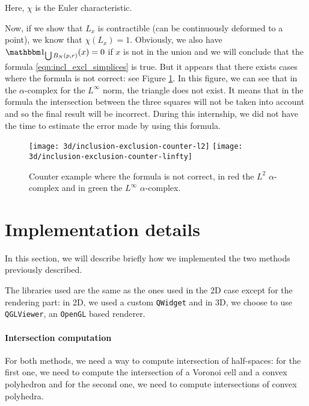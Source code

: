 Here, $ \chi $ is the Euler characteristic.

Now, if we show that $ L_x $ is contractible (can be continuously deformed to a
point), we know that $ \chi(L_x) = 1 $. Obviously, we also have $
\indicator{\bigcup B_N(p, r)}(x) = 0 $ if $ x $ is not in the union and we will
conclude that the formula \ref{eqn:incl_excl_simplices} is true. But it appears
that there exists cases where the formula is not correct: see Figure
\ref{fig:incl_excl-examples}. In this figure, we can see that in the
$\alpha$-complex for the $ L^\infty $ norm, the triangle does not exist. It
means that in the formula the intersection between the three squares will not be
taken into account and so the final result will be incorrect. During this
internship, we did not have the time to estimate the error made by using this
formula.

\begin{figure}[h]
    \centering
    \texttt{[image: 3d/inclusion-exclusion-counter-l2]}
    \hspace{2cm}
    \texttt{[image: 3d/inclusion-exclusion-counter-linfty]}
    \caption{Counter example where the formula is not correct, in red the
        $ L^2$ $\alpha$-complex and in green the $ L^\infty$ $\alpha$-complex.}
    \label{fig:incl_excl-examples}
\end{figure}

\section{Implementation details}
\label{sec:3d-implementation}

In this section, we will describe briefly how we implemented the two methods
previously described.

The libraries used are the same as the ones used in the 2D case except for the
rendering part: in 2D, we used a custom \texttt{QWidget} and in 3D, we choose to
use \texttt{QGLViewer}, an \texttt{OpenGL} based renderer.

\paragraph{Intersection computation}

For both methods, we need a way to compute intersection of half-spaces: for
the first one, we need to compute the intersection of a Voronoi cell and a
convex polyhedron and for the second one, we need to compute intersections of
convex polyhedra.


